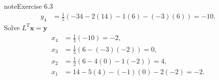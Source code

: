 \documentclass[letterpaper,10pt,english]{jupyterBook}
\begin{document}
\begin{sphinxadmonition}{note}{Exercise 6.3}
\begin{align*}
    y_{4} &= \frac{1}{5} \left( -34 - 2 \left( 14 \right) - 1 \left( 6 \right) - \left( -3 \right) \left( 6 \right)\right) = -10.
\end{align*}
\sphinxAtStartPar
Solve \(L^T \mathbf{x} = \mathbf{y}\)
\begin{align*}
    x_{4} &= \frac{1}{5} \left(-10 \right) = -2, \\
    x_{3} &= \frac{1}{5} \left(6 - \left( -3 \right) \left( -2 \right) \right) = 0, \\
    x_{2} &= \frac{1}{2} \left(6 - 4 \left( 0 \right) - 1 \left( -2 \right) \right) = 4, \\
    x_{1} &= 14 - 5 \left( 4 \right) - \left( -1 \right) \left( 0 \right) - 2 \left( -2 \right) = -2.
\end{align*}\end{sphinxadmonition}
\end{document}
